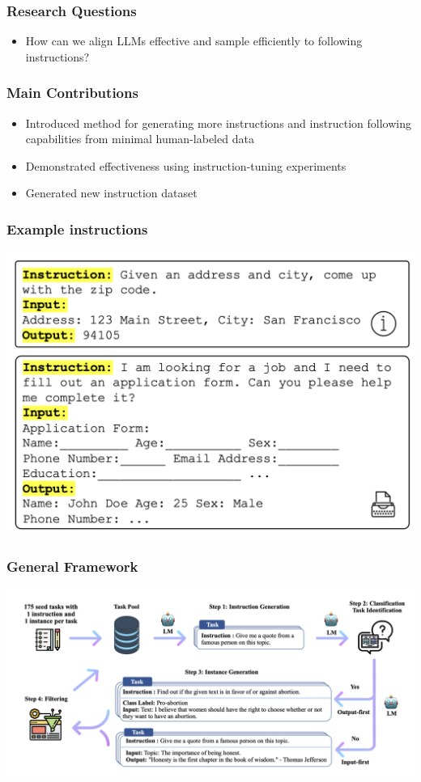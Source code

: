 \documentclass[xcolor=dvipsnames]{beamer}
\newcommand{\0}{\vec{0}}
\begin{document}
\begin{frame}
	\frametitle{Research Questions
	}
	\begin{itemize}
		\item How can we align LLMs effective and sample efficiently to following instructions?
	\end{itemize}
\end{frame}

\begin{frame}
	\frametitle{Main Contributions
	}
	\begin{itemize}
		\item Introduced method for generating more instructions and instruction following capabilities from minimal human-labeled data
		\item Demonstrated effectiveness using instruction-tuning experiments
		\item Generated new instruction dataset
	\end{itemize}
\end{frame}
\begin{frame}
	\frametitle{Example instructions}
	\begin{center}
		\includegraphics[scale=0.4]{Wang1}
	\end{center}
\end{frame}
\begin{frame}
	\frametitle{General Framework}
	\begin{center}
		\includegraphics[width=\textwidth]{Wang2}
	\end{center}
\end{frame}
\end{document}
